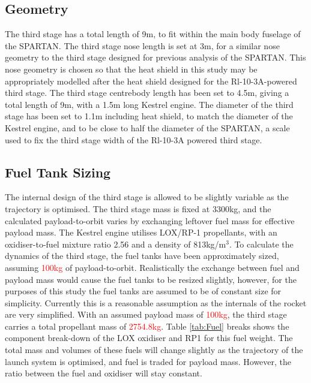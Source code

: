  
 \subsection{Geometry}\label{sec:3int}

The third stage has a total length of 9m, to fit within the main body fuselage of the SPARTAN.
 The third stage nose length is set at 3m, for a similar nose geometry to the third stage designed for previous analysis of the SPARTAN\cite{Preller2017b}. This nose geometry is chosen so that the heat shield in this study may be appropriately modelled after the heat shield designed for the Rl-10-3A-powered third stage\cite{Preller2017b}.
 The third stage centrebody length has been set to 4.5m, giving a total length of 9m, with a 1.5m long Kestrel engine\cite{Vehicle2008}. The diameter of the third stage has been set to 1.1m including heat shield, to match the diameter of the Kestrel engine, and to be close to half the diameter of the SPARTAN, a scale used to fix the third stage width of the Rl-10-3A powered third stage\cite{Preller2017b}.  






	


\subsection{Fuel Tank Sizing}
The internal design of the third stage is allowed to be slightly variable as the trajectory is optimised. The third stage mass is fixed at 3300kg, and the calculated payload-to-orbit varies by exchanging leftover fuel mass for effective payload mass. The Kestrel engine utilises LOX/RP-1 propellants, with an oxidiser-to-fuel mixture ratio 2.56\cite{RPE} and a density of 813kg/m$^3$\cite{Magee}. 
To calculate the dynamics of the third stage, the fuel tanks have been approximately sized, assuming \textcolor{red}{100kg} of payload-to-orbit. Realistically the exchange between fuel and payload mass would cause the fuel tanks to be resized slightly, however, for the purposes of this study the fuel tanks are assumed to be of constant size for simplicity. Currently this is a reasonable assumption as the internals of the rocket are very simplified. With an assumed payload mass of \textcolor{red}{100kg}, the third stage carries a total propellant mass of \textcolor{red}{2754.8kg}. Table \ref{tab:Fuel} breaks shows the component break-down of the LOX oxidiser and RP1 for this fuel weight. The total mass and volumes of these fuels will change slightly as the trajectory of the launch system is optimised, and fuel is traded for payload mass. However, the ratio between the fuel and oxidiser will stay constant. 

